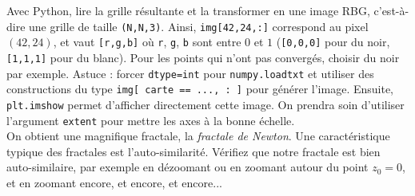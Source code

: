 \documentclass{book}
\newcommand{\inline}[1]{\texttt{#1}}
\begin{document}
Avec Python, lire la grille résultante et la transformer en une image RBG, c'est-à-dire une grille de taille \inline{(N,N,3)}. Ainsi, \inline{img[42,24,:]} correspond au pixel $(42,24)$, et vaut \inline{[r,g,b]} où \texttt{r}, \texttt{g}, \texttt{b} sont entre $0$ et $1$ (\inline{[0,0,0]} pour du noir, \inline{[1,1,1]} pour du blanc). Pour les points qui n'ont pas convergés, choisir du noir par exemple. Astuce : forcer \texttt{dtype=int} pour \texttt{numpy.loadtxt} et utiliser des constructions du type \inline{img[ carte == ..., : ]} pour générer l'image. Ensuite, \inline{plt.imshow} permet d'afficher directement cette image. On prendra soin d'utiliser l'argument \texttt{extent} pour mettre les axes à la bonne échelle.\\

On obtient une magnifique fractale, la \emph{fractale de Newton}. Une caractéristique typique des fractales est l'auto-similarité. Vérifiez que notre fractale est bien auto-similaire, par exemple en dézoomant ou en zoomant autour du point $z_0=0$, et en zoomant encore, et encore, et encore...\\
\end{document}
